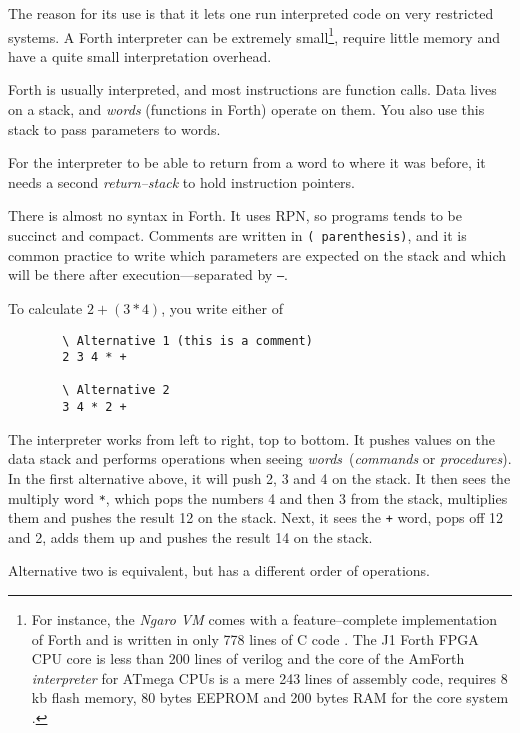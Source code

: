 The reason for its use is that it lets one run interpreted code on very
restricted systems. A Forth interpreter can be extremely small\footnote{For
instance, the \textit{Ngaro \ac{VM}} comes with a feature--complete
implementation of Forth and is written in only 778 lines of C code
\cite{ngaro.vm.core}.  The J1 Forth FPGA CPU core is less than 200 lines of verilog
\cite{bowman2010j1} and the core of the AmForth \textit{interpreter} for
ATmega CPUs is a mere 243 lines of assembly code, requires 8 kb flash
memory, 80 bytes EEPROM and 200 bytes RAM for the core system
\cite{amforth}.}, require little memory and have a quite small
interpretation overhead.

Forth is usually interpreted, and most instructions are function calls.
Data lives on a stack, and \textit{words} (functions in Forth) operate on them.
You also use this stack to pass parameters to words.

For the interpreter to be able to return from a word to where it was before,
it needs a second \textit{return--stack} to hold instruction pointers.

There is almost no syntax in Forth.  It uses \ac{RPN}, so programs tends to
be succinct and compact.  Comments are written in \texttt{( parenthesis)},
and it is common practice to write which parameters are expected on the
stack and which will be there after execution---separated by \texttt{--}.

To calculate $2 + (3 * 4)$, you write either of

\begin{figure}[H]
  \centering
  \begin{Verbatim}
  \ Alternative 1 (this is a comment)
  2 3 4 * +

  \ Alternative 2
  3 4 * 2 +
  \end{Verbatim}
\end{figure}

The interpreter works from left to right, top to bottom. It pushes values on
the data stack and performs operations when seeing
\textit{words} (\textit{commands} or \textit{procedures}).  In the first
alternative above, it will push 2, 3 and 4 on the stack.
  It then sees the multiply word \texttt{*}, which pops the
numbers 4 and then 3 from the stack, multiplies them and pushes the result
12 on the stack.  Next, it sees the \texttt{+} word,
pops off 12 and 2, adds them up and pushes the result 14 on the stack.

Alternative two is equivalent, but has a different order of operations.

